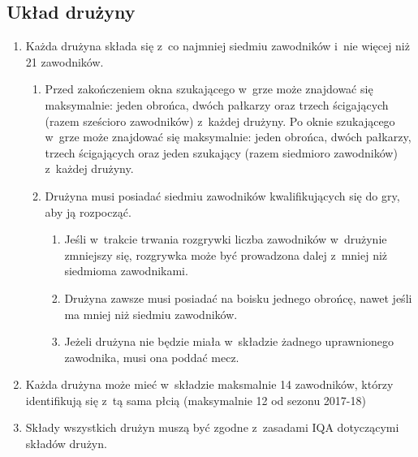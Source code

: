 \documentclass[12pt,a4paper]{article}
\renewcommand{\subsubsection}[1]{
  \oldsubsubsection{#1}%
  \leftskip1.3cm
}
\begin{document}
\subsection{Układ drużyny}

\subsubsection{Składy i~zawodnicy}

\begin{enumerate}
	\item
	      Każda drużyna składa się z~co najmniej siedmiu zawodników i~nie więcej
	      niż 21 zawodników.

	      \begin{enumerate}
		      \item
		            Przed zakończeniem okna szukającego w~grze może znajdować się
		            maksymalnie: jeden obrońca, dwóch pałkarzy oraz trzech ścigających
		            (razem sześcioro zawodników) z~każdej drużyny. Po oknie szukającego
		            w~grze może znajdować się maksymalnie: jeden obrońca, dwóch
		            pałkarzy, trzech ścigających oraz jeden szukający (razem siedmioro
		            zawodników) z~każdej drużyny.
		      \item
		            Drużyna musi posiadać siedmiu zawodników kwalifikujących się do gry,
		            aby ją rozpocząć.

		            \begin{enumerate}
			            \item
			                  Jeśli w~trakcie trwania rozgrywki liczba zawodników w~drużynie
			                  zmniejszy się, rozgrywka może być prowadzona dalej z~mniej niż
			                  siedmioma zawodnikami.
			            \item
			                  Drużyna zawsze musi posiadać na boisku jednego obrońcę, nawet jeśli ma mniej niż siedmiu zawodników.
			            \item
			                  Jeżeli drużyna nie będzie miała w~składzie żadnego uprawnionego
			                  zawodnika, musi ona poddać mecz.
		            \end{enumerate}
	      \end{enumerate}
	\item
	      Każda drużyna może mieć w~składzie maksmalnie 14 zawodników, którzy
	      identifikują się z~tą sama płcią (maksymalnie 12 od sezonu 2017-18)
	\item
	      Składy wszystkich drużyn muszą być zgodne z~zasadami IQA dotyczącymi
	      składów drużyn.
\end{enumerate}
\end{document}
